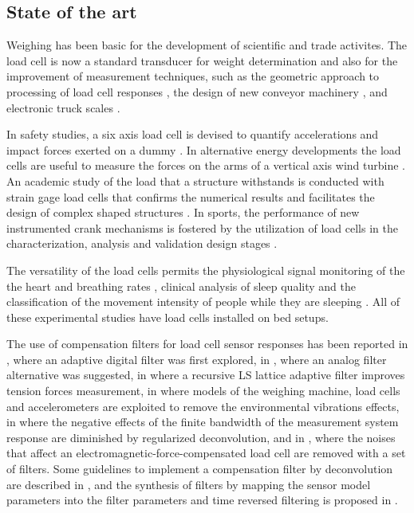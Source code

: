 \subsection{State of the art}
Weighing has been basic for the development of scientific and trade activites. 
The load cell is now a standard transducer for weight determination and also for the improvement of measurement techniques, such as the geometric approach to processing of load cell responses \cite{Kesilmis16}, the design of new conveyor machinery \cite{Yamani18}, and electronic truck scales \cite{Guo18}.

In safety studies, a six axis load cell is devised to quantify accelerations and impact forces exerted on a dummy \cite{Ballo16}.
In alternative energy developments the load cells are useful to measure the forces on the arms of a vertical axis wind turbine \cite{Rossander15}.
An academic study of the load that a structure withstands is conducted with strain gage load cells that confirms the numerical results and facilitates the design of complex shaped structures \cite{Olmi16}.
In sports, the performance of new instrumented crank mechanisms is fostered by the utilization of load cells in the characterization, analysis and validation design stages \cite{Casas16}.

The versatility of the load cells permits the physiological signal monitoring of the the heart and breathing rates \cite{Lee16}, clinical analysis of sleep quality \cite{Zahradka18} and the classification of the movement intensity of people while they are sleeping \cite{Alaziz17}. 
All of these experimental studies have load cells installed on bed setups.

The use of compensation filters for load cell sensor responses has been reported 
in \cite{Shu93}, where an adaptive digital filter was first explored,
in \cite{Jafaripanah05}, where an analog filter alternative was suggested,
in \cite{Hernandez06} where a recursive LS lattice adaptive filter improves tension forces measurement, 
in \cite{Boschetti13} where models of the weighing machine, load cells and accelerometers are exploited to remove the environmental vibrations effects, 
in \cite{Dienstfrey14} where the negative effects of the finite bandwidth of the measurement system response are diminished by regularized deconvolution, and
in \cite{Huang16}, where the noises that affect an electromagnetic-force-compensated load cell are removed with a set of filters.
Some guidelines to implement a compensation filter by deconvolution are described in \cite{Eichstadt10}, and
the synthesis of filters by mapping the sensor model parameters into the filter parameters and time reversed filtering is proposed in \cite{Hessling08a}.

